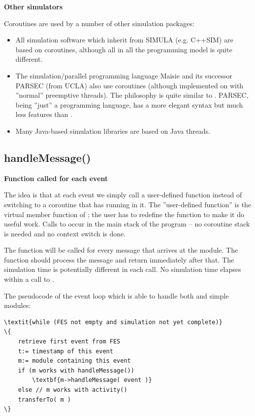 \textbf{Other simulators}


Coroutines are used by a number of other simulation packages:
\begin{itemize}
\item{All simulation software which inherit from SIMULA (e.g. C++SIM) 
    are based on coroutines, although all in all the programming 
    model is quite different.}
\item{The simulation/parallel programming language Maisie and its successor 
    PARSEC (from UCLA) also use coroutines (although implemented 
    on with ''normal'' preemptive threads). The philosophy 
    is quite similar to {\opp}. PARSEC, being ''just'' 
    a programming language, has a more elegant syntax but much less 
    features than {\opp}.}
\item{Many Java-based simulation libraries are based on Java 
    threads.}
\end{itemize}



\subsection{handleMessage()}

\textbf{Function called for each event}


The idea is that at each event we simply call a
user-defined function instead of switching to a coroutine that has
 running in it. The ''user-defined function'' is the
 virtual member
function of ; the user has to redefine the
function to make it do useful work.  Calls to 
occur in the main stack of the program -- no coroutine stack is needed
and no context switch is done.


The  function will be called for every message 
that arrives at the module. The function should process the message 
and return immediately after that. The simulation time is potentially 
different in each call. No simulation time elapses within a call 
to .


The pseudocode of the event loop which is able to handle both  
and  simple modules:


\begin{Verbatim}[commandchars=\\\{\}]
\textit{while (FES not empty and simulation not yet complete)}
\{
    retrieve first event from FES
    t:= timestamp of this event
    m:= module containing this event
    if (m works with handleMessage())
        \textbf{m->handleMessage( event )}
    else // m works with activity()
    transferTo( m )
\}
\end{Verbatim}
  

